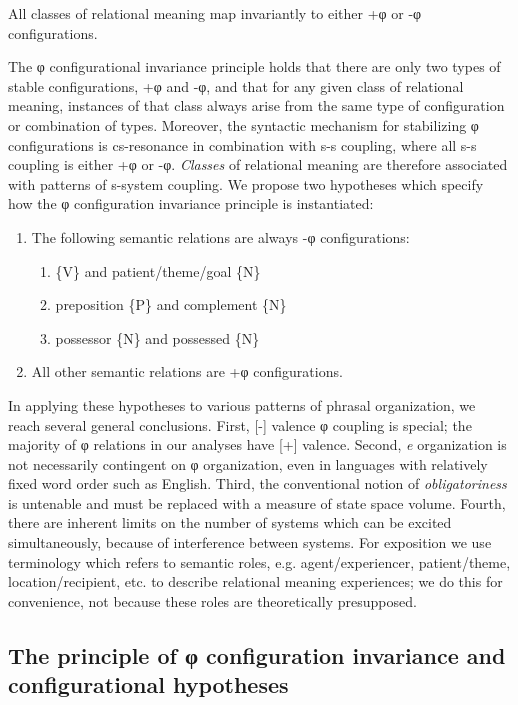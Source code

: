   All classes of relational meaning map invariantly to either +φ or -φ configurations. 

  The φ configurational invariance principle holds that there are only two types of stable configurations, +φ and -φ, and that for any given class of relational meaning, instances of that class always arise from the same type of configuration or combination of types. Moreover, the syntactic mechanism for stabilizing φ configurations is cs-resonance in combination with s-s coupling, where all s-s coupling is either +φ or -φ. \textit{Classes} of relational meaning are therefore associated with patterns of s-system coupling. We propose two hypotheses which specify how the φ configuration invariance principle is instantiated:
  
\begin{enumerate}
\item The following semantic relations are always -φ configurations:
\begin{enumerate}
  \item \{V\} and patient/theme/goal \{N\}
  \item preposition \{P\} and complement \{N\}
  \item possessor \{N\} and possessed \{N\}
\end{enumerate}
\item  All other semantic relations are +φ configurations.
\end{enumerate}

  In applying these hypotheses to various patterns of phrasal organization, we reach several general conclusions. First, [-] valence φ coupling is special; the majority of φ relations in our analyses have [+] valence. Second, \textit{e} organization is not necessarily contingent on φ organization, even in languages with relatively fixed word order such as English. Third, the conventional notion of \textit{obligatoriness} is untenable and must be replaced with a measure of state space volume. Fourth, there are inherent limits on the number of systems which can be excited simultaneously, because of interference between systems. For exposition we use terminology which refers to semantic roles, e.g. agent/experiencer, patient/theme, location/recipient, etc. to describe relational meaning experiences; we do this for convenience, not because these roles are theoretically presupposed.

\subsection{The principle of \textup{φ configuration} invariance and configurational hypotheses}

